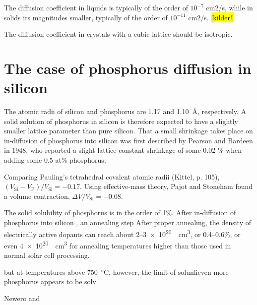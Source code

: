 \documentclass[11pt,bibliography=totoc,index=totoc]{scrbook}   %
\newcommand{\comment}[1]{\hl{#1}}
\begin{document}
The diffusion coefficient in liquids is typically of the order of $10^{-7}$ cm2/s,
while in solids its magnitudes smaller, typically of the order of $10^{-11}$ cm2/s. \comment{[kilder!]}


The diffusion coefficient in crystals with a cubic lattice should be isotropic.

\section{The case of phosphorus diffusion in silicon}\label{sec:PinSi}

The atomic radii of silicon and phosphorus are 1.17 and 1.10~Å, respectively.
A solid solution of phosphorus in silicon is therefore expected to have a slightly smaller lattice parameter than pure silicon.
That a small shrinkage takes place on in-diffusion of phosphorus into silicon was first described by Pearson and Bardeen in 1948, who reported a slight lattice constant shrinkage of some 0.02 \% when adding some 0.5 at\% phosphorus,\cite{Pearson:1949} 

Comparing Pauling's tetrahedral covalent atomic radii (Kittel, p. 105), $(V_{\text{Si}}-V_{\text{P}})/V_{\text{Si}} = -0.17$.
Using effective-mass theory, Pajot and Stoneham found a volume contraction, $\Delta V/V_{\text{Si}} = -0.08$.

The solid solubility of phosphorus is in the order of 1\%. After in-diffusion of phosphorus into silicon , an annealing step 
After proper annealing, the density of electrically active dopants can reach about 2–\SI{3e20}{\per\centi\metre\cubed}, or 0.4--0.6\%,
or even \SI{4e20}{\per\centi\metre\cubed} for annealing temperatures higher than those used in normal solar cell processing.

but at temperatures above \SI{750}{\celsius}, 
however, the limit of solunlieven more phosphorus appears to be solv

Newero\cite{Borisenko:1987} and \cite{Safarian:2011} 
\end{document}
